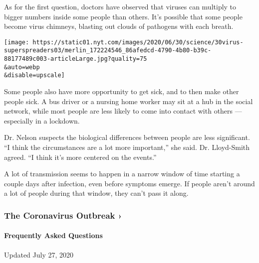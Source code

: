 As for the first question, doctors have observed that viruses can
multiply to bigger numbers inside some people than others. It's possible
that some people become virus chimneys, blasting out clouds of pathogens
with each breath.

\texttt{[image: https://static01.nyt.com/images/2020/06/30/science/30virus-superspreaders03/merlin\_172224546\_86afedcd-4790-4b80-b39c-88177489c003-articleLarge.jpg?quality=75\\\&auto=webp\\\&disable=upscale]}

Some people also have more opportunity to get sick, and to then make
other people sick. A bus driver or a nursing home worker may sit at a
hub in the social network, while most people are less likely to come
into contact with others --- especially in a lockdown.

Dr. Nelson suspects the biological differences between people are less
significant. ``I think the circumstances are a lot more important,'' she
said. Dr. Lloyd-Smith agreed. ``I think it's more centered on the
events.''

A lot of transmission seems to happen in a narrow window of time
starting a couple days after infection, even before symptoms emerge. If
people aren't around a lot of people during that window, they can't pass
it along.

\href{https://www.nytimes.com/news-event/coronavirus?action=click\&pgtype=Article\&state=default\&region=MAIN_CONTENT_3\&context=storylines_faq}{}

\hypertarget{the-coronavirus-outbreak-}{%
\subsubsection{The Coronavirus Outbreak
›}\label{the-coronavirus-outbreak-}}

\hypertarget{frequently-asked-questions}{%
\paragraph{Frequently Asked
Questions}\label{frequently-asked-questions}}

Updated July 27, 2020

